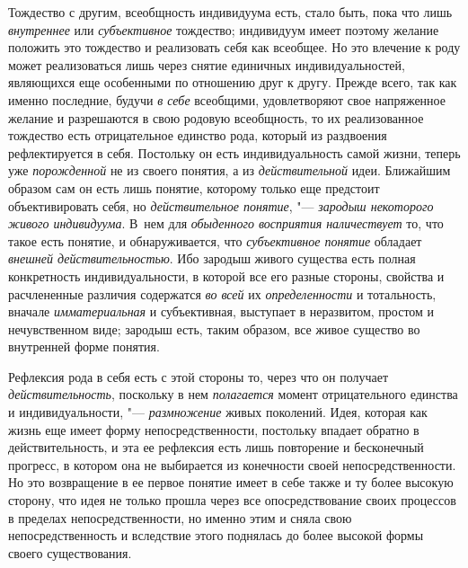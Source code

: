 Тождество с другим, всеобщность индивидуума есть, стало быть,
пока что лишь {\em внутреннее}
или {\em субъективное}
тождество; индивидуум имеет поэтому желание положить это
тождество и реализовать себя как всеобщее. Но это влечение к роду может
реализоваться лишь через снятие единичных индивидуальностей, являющихся еще
особенными по отношению друг к другу. Прежде всего, так как именно
последние, будучи {\em в себе}
всеобщими, удовлетворяют свое напряженное желание и
разрешаются в свою родовую всеобщность, то их реализованное тождество есть
отрицательное единство рода, который из раздвоения рефлектируется в себя.
Постольку он есть индивидуальность самой жизни, теперь уже
{\em порожденной} не из
своего понятия, а из
{\em действительной}
идеи. Ближайшим образом сам он есть лишь
понятие, которому только еще предстоит объективировать себя, но
{\em действительное понятие}, "---
{\em зародыш некоторого живого
индивидуума}. В~нем для
{\em обыденного восприятия
наличествует} то, что такое есть понятие, и обнаруживается,
что {\em субъективное понятие}
обладает {\em внешней
действительностью}. Ибо зародыш живого существа есть полная
конкретность индивидуальности, в которой все его разные стороны, свойства и
расчлененные различия содержатся {\em во
всей} их
{\em определенности} и
тотальность, вначале
{\em имматериальная} и
субъективная, выступает в неразвитом, простом и нечувственном виде; зародыш
есть, таким образом, все живое существо во внутренней форме понятия.

Рефлексия рода в себя есть с этой стороны то, через что он
получает {\em действительность},
поскольку в нем
{\em полагается} момент
отрицательного единства и индивидуальности, "---
{\em размножение} живых
поколений. Идея, которая как жизнь еще имеет форму непосредственности,
постольку впадает обратно в действительность, и эта ее рефлексия есть лишь
повторение и бесконечный прогресс, в котором она не выбирается из
конечности своей непосредственности. Но это возвращение в ее первое понятие
имеет в себе также и ту более высокую сторону, что идея не только прошла
через все опосредствование своих процессов в пределах непосредственности,
но именно этим и сняла свою непосредственность и вследствие этого поднялась
до более высокой формы своего существования.

